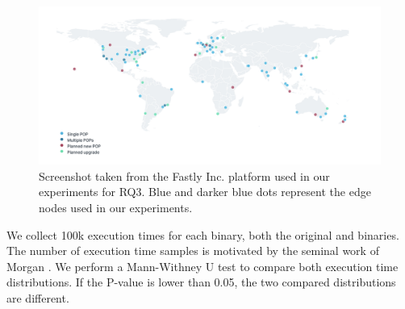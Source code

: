 \begin{figure}[h]
    \centering
    \includegraphics[width=\linewidth]{diagrams/pops.png}
    \caption{Screenshot taken from the Fastly Inc. platform used in our experiments for RQ3. Blue and darker blue dots represent the edge nodes used in our experiments.}
    \label{diagrams:protocol:rq3:map}
\end{figure}



We collect 100k execution times for each binary, both the original and binaries. The number of execution time samples is motivated by the seminal work of Morgan \etal \cite{morgan2015web}. 
We perform a Mann-Withney U test \cite{mann1947} to compare both execution time distributions. 
If the P-value is lower than 0.05, the two compared distributions are different.